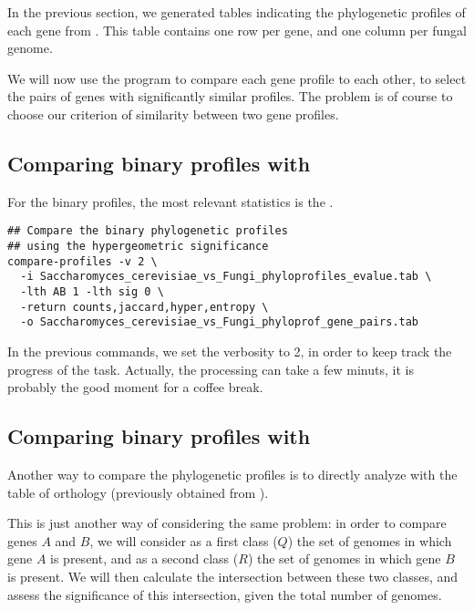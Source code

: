 In the previous section, we generated tables indicating the
phylogenetic profiles of each gene from . This table contains one row per gene, and one column
per fungal genome. 

We will now use the program  to compare each
gene profile to each other, to select the pairs of genes with
significantly similar profiles. The problem is of course to choose our
criterion of similarity between two gene profiles.

\subsection{Comparing binary profiles with }

For the binary profiles, the most relevant statistics is the
.

\begin{footnotesize}
\begin{verbatim}
## Compare the binary phylogenetic profiles 
## using the hypergeometric significance
compare-profiles -v 2 \
  -i Saccharomyces_cerevisiae_vs_Fungi_phyloprofiles_evalue.tab \
  -lth AB 1 -lth sig 0 \
  -return counts,jaccard,hyper,entropy \
  -o Saccharomyces_cerevisiae_vs_Fungi_phyloprof_gene_pairs.tab
\end{verbatim}
\end{footnotesize}

In the previous commands, we set the verbosity to 2, in order to keep
track the progress of the task. Actually, the processing can take a
few minuts, it is probably the good moment for a coffee break.

\subsection{Comparing binary profiles with }

Another way to compare the phylogenetic profiles is to directly
analyze with \program{compare-classes} the table of orthology
(previously obtained from \program{get-orthologs}).

This is just another way of considering the same problem: in order to
compare genes $A$ and $B$, we will consider as a first class ($Q$) the
set of genomes in which gene $A$ is present, and as a second class
($R$) the set of genomes in which gene $B$ is present. We will then
calculate the intersection between these two classes, and assess the
significance of this intersection, given the total number of
genomes.

